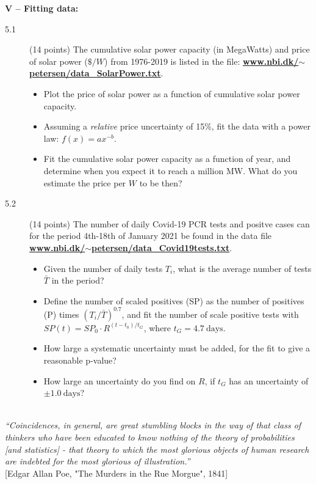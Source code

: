 \documentclass[11pt]{article}
\begin{document}
\noindent
{\bf V -- Fitting data:}
\begin{description}
\item[5.1] (14 points) 
  The cumulative solar power capacity (in MegaWatts) and price of solar power ($\$/W$) from 1976-2019 is listed in the file:
  \href{http://www.nbi.dk/~petersen/data\_SolarPrice.txt}{\bf www.nbi.dk/$\sim$petersen/data\_SolarPower.txt}.
  \vspace*{-1ex}
  \begin{itemize}
    \item Plot the price of solar power as a function of cumulative solar power capacity.
    \item Assuming a \emph{relative} price uncertainty of 15\%, fit the data with a power law: $f(x) = a x^{-b}$.
    \item Fit the cumulative solar power capacity as a function of year, and determine when you expect it to reach a million MW.
      What do you estimate the price per $W$ to be then?
  \end{itemize}
%
\item[5.2] (14 points)
  The number of daily Covid-19 PCR tests and positve cases can for the period 4th-18th of January 2021 be found in the data file
  \href{http://www.nbi.dk/~petersen/data\_Covid19tests.txt}{\bf www.nbi.dk/$\sim$petersen/data\_Covid19tests.txt}.
  \vspace{-1.0ex}
  \begin{itemize}
    \item Given the number of daily tests $T_i$, what is the average number of tests $\bar{T}$ in the period?
    \item Define the number of scaled positives (SP) as the number of positives (P) times $(T_i/\bar{T})^{0.7}$,
      and fit the number of scale positive tests with $SP(t) = SP_0 \cdot R^{(t - t_0)/t_G}$, where $t_G = 4.7~\mbox{days}$.
    \item How large a systematic uncertainty must be added, for the fit to give a reasonable p-value?
    \item How large an uncertainty do you find on $R$, if $t_G$ has an uncertainty of $\pm 1.0~\mbox{days}$?
  \end{itemize}
\vspace*{-2ex}
\end{description}



\noindent
\hrulefill\\
\emph{``Coincidences, in general, are great stumbling blocks in the way of that class of thinkers who have been educated to know nothing of the theory of probabilities [and statistics] - that theory to which the most glorious objects of human research are indebted for the most glorious of illustration.''}\\
  \phantom{} \hfill [Edgar Allan Poe, "The Murders in the Rue Morgue", 1841]\\[-2ex]
\end{document}
